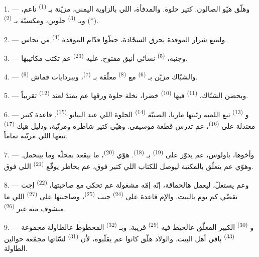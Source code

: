 1. --- وهلّق هيّو الصالون.  كتير حلوة. والمدفأة، اللي
بالزاوية اليمنى، مزيّنة بـ \textsuperscript{(1)} ناعم،
وبـ \textsuperscript{(3)} حلوين، ومكسيّة بـ \textsuperscript{(2)} (*).

2. --- ولمنع شرار الموقدة يحرق السجّادة، حطّوا قدّام الموقدة
 \textsuperscript{(4)} من نحاس.

3. --- وجنبه،  \textsuperscript{(5)} نسائي أنيق مفتوح. عليه
 \textsuperscript{(23)} عم تكتب مكاتيبها.

4. --- والشبّاك مزيّن بـ \textsuperscript{(6)} مع
 \textsuperscript{(8)} معلّقة بـ
\textsuperscript{(7)}، وببردايات قماش 
\textsuperscript{(9)}.

5. --- وبحضن الشبّاك،  \textsuperscript{(11)} فيها
 \textsuperscript{(10)} خضرا، نخلة حلوة ورقها عم يمتدّ لعند
 \textsuperscript{(12)} تقريباً.

6. --- و \textsuperscript{(13)} تبع اللمبة رتّبتها
ماريا، الصبيّة \textsuperscript{(14)} الحلوة اللي عند البيانو
\textsuperscript{(15)}. قاعدة كتير معتدلة على 
\textsuperscript{(16)}، عم تدرس قطعة موسيقى. وهيّي كتير شاطرة ومرتّبة،
ودليل هيك  \textsuperscript{(17)} تبعها اللي مرتّبة
تماماً.

\VUsaut{5.0mm}
\VUsaut{3.0mm}

7. --- وأخوها، باولوس، عم يدوّر على  \textsuperscript{(19)}
بـ \textsuperscript{(18)}. هوّي 
\textsuperscript{(20)}، ما بيقعد بمحلّه وما بينحمل. وهوّي عم يتعلّق
بالمكتبة ليوصل للكتاب اللي كتير فوق، عم يخاطر يوقّع
 \textsuperscript{(21)} اللي فوق.

8. --- وعم يستغلّ، ليعمل هالحماقة، إنّه إمّه مشغولة عم تحكي مع صاحبتها،
 \textsuperscript{(22)} إجت تقضّي كم يوم بالبيت. والإم قاعدة
على  \textsuperscript{(24)} جنب 
\textsuperscript{(25)}، وصاحبتها على  \textsuperscript{(27)}
اللي ما منشوف منه غير  \textsuperscript{(26)}.

9. --- و \textsuperscript{(30)} الكبير المعلّق عالحيط فيه
 \textsuperscript{(29)} قريبة. وبـ
\textsuperscript{(32)} المحطوط عالطاولة مجموعة 
\textsuperscript{(33)} باقي أهل البيت. والولاد هلّق كانوا عم يقلّبوه،
لأن  \textsuperscript{(31)} لسّاتها مجمّعة حوالين الطاولة.

